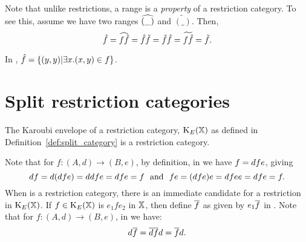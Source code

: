 \begin{remark}
  Note that unlike restrictions, a range is a \emph{property} of a restriction category. To see
  this, assume we have two ranges $\widehat{(\_)}$ and $\widetilde{(\_)}$. Then,
  \[\hat{f}=\widehat{f \tilde{f}}=\hat{f} \tilde{f}=\tilde{f} \hat{f}=\widetilde{f \hat{f}}=\tilde{f}.\]
\end{remark}

\begin{example}\label{ex:ranges}
   In \pinj, $\hat{f} = \{(y,y) | \exists x. (x,y) \in f\}$.
\end{example}
\section{Split restriction categories} %
\label{sub:split_restriction_categories}

The Karoubi envelope of a restriction category, $\text{K}_{E}(\mathbb{X})$ as defined in
Definition~\ref{def:split_category} is a restriction category.

Note that for $f:(A,d)\to(B,e)$, by definition, in \X we have $f=d\hspace{0.1pt} f e$, giving
\[
  d\hspace{0.1pt} f = d(d\hspace{0.1pt} f e) = d\hspace{0.1pt} d\hspace{0.1pt} f e = d\hspace{0.1pt} f e =f\
  \text{ and }\  f e = (d\hspace{0.1pt} f e)e = d\hspace{0.1pt} f e\hspace{0.1pt} e = d\hspace{0.1pt} f e = f.
\]
When \X is a restriction category, there is an immediate candidate for a restriction in
$\text{K}_{E}(\mathbb{X})$. If $f\in\text{K}_{E}(\mathbb{X})$ is $e_1 f e_2$ in $\mathbb{X}$, then define $\overline{f}$ as
given by $e_1 \overline{f}$ in \X. Note that for $f:(A,d)\to(B,e)$, in \X we have:
\[
  d\hspace{0.1pt}\overline{f} = \overline{d\hspace{0.1pt} f} d = \overline{f} d.
\]

